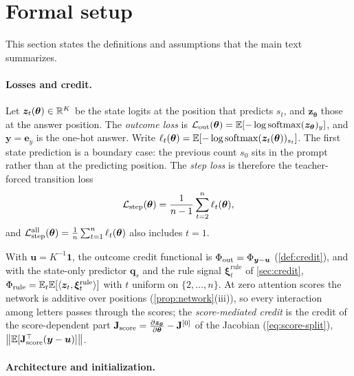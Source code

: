 \providecommand{\reg}[1]{\ensuremath{\mathsf{#1}}}

\section{Formal setup}
\label{app:formal}

This section states the definitions and assumptions that the main text summarizes.

\paragraph{Losses and credit.}

\begin{definition}
\label{def:losses}
Let $\bm z_t(\bm\theta)\in\mathbb R^K$ be the state logits at the position that predicts $s_t$, and $\bm z_{\bm\theta}$
those at the answer position. The \emph{outcome loss} is $\mathcal L_{\mathrm{out}}(\bm\theta)=\mathbb E[-\log\operatorname{softmax}(\bm z_{\bm\theta})_y]$, and $\bm y=\bm e_y$ is the one-hot answer.
Write $\ell_t(\bm\theta)=\mathbb E[-\log\operatorname{softmax}(\bm z_t(\bm\theta))_{s_t}]$. The first state prediction is a boundary case: the previous
count $s_0$ sits in the prompt rather than at the predicting position. The \emph{step loss} is therefore the teacher-forced
transition loss
\[
 \mathcal L_{\mathrm{step}}(\bm\theta)=\frac{1}{n-1}\sum_{t=2}^n\ell_t(\bm\theta),
\]
and $\Lstep^{\mathrm{all}}(\bm\theta)=\tfrac{1}{n}\sum_{t=1}^n\ell_t(\bm\theta)$ also includes $t=1$.
\end{definition}

With $\bm u=K^{-1}\bm 1$, the outcome credit functional is $\Phi_{\mathrm{out}}=\Phi_{\bm y-\bm u}$ (\cref{def:credit}), and with the state-only
predictor $\bm q_s$ and the rule signal $\bm\xi^{\mathrm{rule}}_t$ of \cref{sec:credit}, $\Phi_{\mathrm{rule}}=\mathbb E_t\mathbb E[\langle\bm z_t,\bm\xi^{\mathrm{rule}}_t\rangle]$ with $t$ uniform on $\{2,\ldots,n\}$. At zero
attention scores the network is additive over positions (\cref{prop:network}(iii)), so every interaction among letters passes through the
scores; the \emph{score-mediated credit} is the credit of the score-dependent part $\mathbf J_{\mathrm{score}}=\Jz-\mathbf J^{[0]}$ of the Jacobian (\cref{eq:score-split}),
$\bigl\|\mathbb E[\mathbf J_{\mathrm{score}}^\top(\bm y-\bm u)]\bigr\|$.

\paragraph{Architecture and initialization.}


